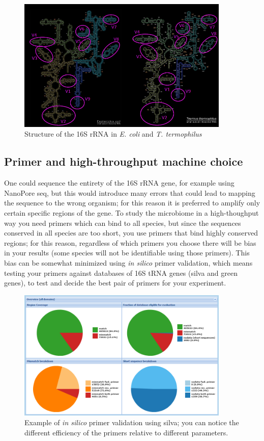     \begin{figure}[!h]
      \centering
      \includegraphics[width=0.9\textwidth]{16S_rRNA.png}
      \caption{\label{fig:16S_rRNA}Structure of the 16S rRNA in \textit{E. coli} and \textit{T. termophilus}}
    \end{figure}

  \subsection{Primer and high-throughput machine choice}
    One could sequence the entirety of the 16S rRNA gene, for example using NanoPore seq, but this would introduce many errors that could lead to mapping the sequence to the wrong organism; for this reason it is preferred to amplify only certain specific regions of the gene.
    To study the microbiome in a high-thoughput way you need primers which can bind to all species, but since the sequences conserved in all species are too short, you use primers that bind highly conserved regions; for this reason, regardless of which primers you choose there will be bias in your results (some species will not be identifiable using those primers). This bias can be somewhat minimized using \textit{in silico} primer validation, which means testing your primers against databases of 16S tRNA genes (silva and green genes), to test and decide the best pair of primers for your experiment.

    \begin{figure}[!h]
      \centering
      \includegraphics[width=0.9\textwidth]{silva_analysis.png}
      \caption{\label{fig:silva_analysis}Example of \textit{in silico} primer validation using silva; you can notice the different efficiency of the primers relative to different parameters.}
    \end{figure}

